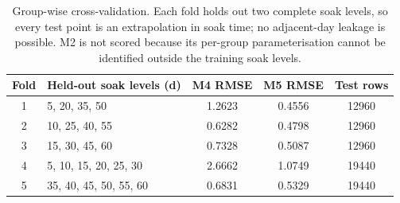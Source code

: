 \begin{table}[htbp]
\centering
\caption{Group-wise cross-validation. Each fold holds out two complete soak levels, so every test point is an extrapolation in soak time; no adjacent-day leakage is possible. M2 is not scored because its per-group parameterisation cannot be identified outside the training soak levels.}
\label{tab:cv}
\small
\begin{tabular}{@{}clccc@{}}
\toprule
Fold & Held-out soak levels (d) & M4 RMSE & M5 RMSE & Test rows \\
\midrule
1 & 5, 20, 35, 50 & 1.2623 & 0.4556 & 12960 \\
2 & 10, 25, 40, 55 & 0.6282 & 0.4798 & 12960 \\
3 & 15, 30, 45, 60 & 0.7328 & 0.5087 & 12960 \\
4 & 5, 10, 15, 20, 25, 30 & 2.6662 & 1.0749 & 19440 \\
5 & 35, 40, 45, 50, 55, 60 & 0.6831 & 0.5329 & 19440 \\
\bottomrule
\end{tabular}
\end{table}
